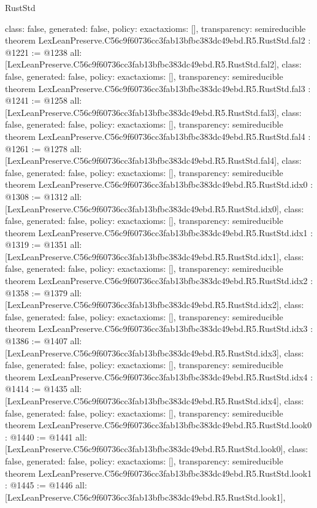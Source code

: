 \begin{lexlean}{RustStd}
\begin{coremodule}
{  class: false,
  generated: false,
  policy: exact{axioms: []},
  transparency: semireducible
}
theorem LexLeanPreserve.C56c9f60736cc3fab13bfbc383dc49ebd.R5.RustStd.fal2 : @1221 := @1238 {
  all: [LexLeanPreserve.C56c9f60736cc3fab13bfbc383dc49ebd.R5.RustStd.fal2],
  class: false,
  generated: false,
  policy: exact{axioms: []},
  transparency: semireducible
}
theorem LexLeanPreserve.C56c9f60736cc3fab13bfbc383dc49ebd.R5.RustStd.fal3 : @1241 := @1258 {
  all: [LexLeanPreserve.C56c9f60736cc3fab13bfbc383dc49ebd.R5.RustStd.fal3],
  class: false,
  generated: false,
  policy: exact{axioms: []},
  transparency: semireducible
}
theorem LexLeanPreserve.C56c9f60736cc3fab13bfbc383dc49ebd.R5.RustStd.fal4 : @1261 := @1278 {
  all: [LexLeanPreserve.C56c9f60736cc3fab13bfbc383dc49ebd.R5.RustStd.fal4],
  class: false,
  generated: false,
  policy: exact{axioms: []},
  transparency: semireducible
}
theorem LexLeanPreserve.C56c9f60736cc3fab13bfbc383dc49ebd.R5.RustStd.idx0 : @1308 := @1312 {
  all: [LexLeanPreserve.C56c9f60736cc3fab13bfbc383dc49ebd.R5.RustStd.idx0],
  class: false,
  generated: false,
  policy: exact{axioms: []},
  transparency: semireducible
}
theorem LexLeanPreserve.C56c9f60736cc3fab13bfbc383dc49ebd.R5.RustStd.idx1 : @1319 := @1351 {
  all: [LexLeanPreserve.C56c9f60736cc3fab13bfbc383dc49ebd.R5.RustStd.idx1],
  class: false,
  generated: false,
  policy: exact{axioms: []},
  transparency: semireducible
}
theorem LexLeanPreserve.C56c9f60736cc3fab13bfbc383dc49ebd.R5.RustStd.idx2 : @1358 := @1379 {
  all: [LexLeanPreserve.C56c9f60736cc3fab13bfbc383dc49ebd.R5.RustStd.idx2],
  class: false,
  generated: false,
  policy: exact{axioms: []},
  transparency: semireducible
}
theorem LexLeanPreserve.C56c9f60736cc3fab13bfbc383dc49ebd.R5.RustStd.idx3 : @1386 := @1407 {
  all: [LexLeanPreserve.C56c9f60736cc3fab13bfbc383dc49ebd.R5.RustStd.idx3],
  class: false,
  generated: false,
  policy: exact{axioms: []},
  transparency: semireducible
}
theorem LexLeanPreserve.C56c9f60736cc3fab13bfbc383dc49ebd.R5.RustStd.idx4 : @1414 := @1435 {
  all: [LexLeanPreserve.C56c9f60736cc3fab13bfbc383dc49ebd.R5.RustStd.idx4],
  class: false,
  generated: false,
  policy: exact{axioms: []},
  transparency: semireducible
}
theorem LexLeanPreserve.C56c9f60736cc3fab13bfbc383dc49ebd.R5.RustStd.look0 : @1440 := @1441 {
  all: [LexLeanPreserve.C56c9f60736cc3fab13bfbc383dc49ebd.R5.RustStd.look0],
  class: false,
  generated: false,
  policy: exact{axioms: []},
  transparency: semireducible
}
theorem LexLeanPreserve.C56c9f60736cc3fab13bfbc383dc49ebd.R5.RustStd.look1 : @1445 := @1446 {
  all: [LexLeanPreserve.C56c9f60736cc3fab13bfbc383dc49ebd.R5.RustStd.look1],
}
\end{coremodule}
\end{lexlean}
